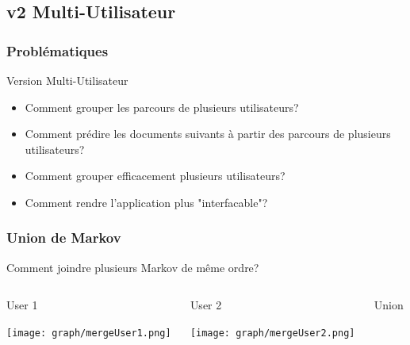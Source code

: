 \documentclass{beamer}
\begin{document}
        \subsection{v2 Multi-Utilisateur}
            \begin{frame}
                \frametitle{Problématiques}
                Version Multi-Utilisateur
                \pause
                \begin{itemize}
                    \item Comment grouper les parcours de plusieurs utilisateurs?
                    \pause
                    \item Comment prédire les documents suivants à partir des parcours de plusieurs utilisateurs?
                    \pause
                    \item Comment grouper efficacement plusieurs utilisateurs?
                    \pause
                    \item Comment rendre l'application plus "interfacable"?
                \end{itemize}
            \end{frame}
            \begin{frame}
                \frametitle{Union de Markov}
                Comment joindre plusieurs Markov de même ordre?
                \pause[2]
                \begin{columns}[t]
                    \begin{column}{3cm}
                        \begin{block}{User 1}
                            \begin{center}
                                \texttt{[image: graph/mergeUser1.png]}
                            \end{center}
                        \end{block}
                    \end{column}
                    \begin{column}{3cm}
                        \begin{block}{User 2}
                            \begin{center}
                                \texttt{[image: graph/mergeUser2.png]}
                            \end{center}
                        \end{block}
                    \end{column}
                    \pause[3]
                    \begin{column}{3cm}
                        \begin{block}{Union}
                            \begin{center}
                                \pause[4]
                            \end{center}
                        \end{block}
                    \end{column}
                \end{columns}
            \end{frame}
\end{document}

